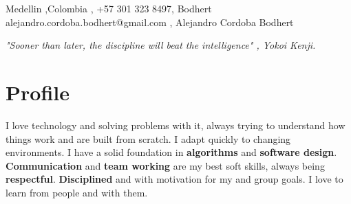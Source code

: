\documentclass[
    changecolor={111, 156, 45}, 
]{cv-roald}
\begin{document}
\pagestyle{empty} %

 {%
  \faMapMarker \FAspace Medellin \sep Colombia \sep%
  \faMobile \FAspace +57 301 323 8497\sep%
  \faGithub Bodhert \FAspace {}
 }
 {%
  \faEnvelope \FAspace alejandro.cordoba.bodhert@gmail.com \sep%
  \faLinkedinSquare  \FAspace Alejandro Cordoba Bodhert \FAspace {}
 }




\textit{"Sooner than later, the discipline will beat the intelligence" , \textit{Yokoi Kenji}.}

\section*{Profile}
I love technology and solving problems with it, always trying to understand how things work and are built from scratch. I adapt quickly to changing environments. I have a solid foundation in \textbf{algorithms} and \textbf{software design}. \textbf{Communication} and \textbf{team working} are my best soft skills, always being \textbf{respectful}. \textbf{Disciplined} and with motivation for my and group goals. I love to learn from people and with them.
\end{document}
